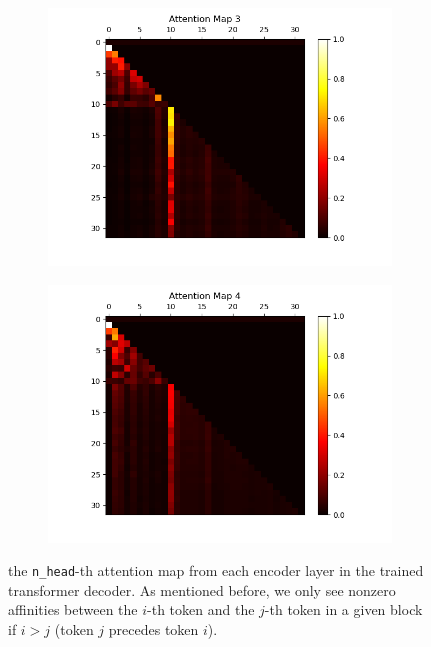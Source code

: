 \documentclass[10pt]{article}
\newcommand{\code}[1]{\texttt{#1}}
\theoremstyle{definition}
\begin{document}
\begin{figure}[H]
\begin{subfigure}[b]{0.35\textwidth}
        \label{subfig:am2}
    \end{subfigure}
    \begin{subfigure}[b]{0.35\textwidth}
        \centering
        \includegraphics[width=\textwidth]{../data/plots/part2/attention_map_3.png}
        \label{subfig:am3}
    \end{subfigure}
    \begin{subfigure}[b]{0.35\textwidth}
        \centering
        \includegraphics[width=\textwidth]{../data/plots/part2/attention_map_4.png}
        \label{subfig:am4}
    \end{subfigure}
\caption{the \code{n\_head}-th attention map from each encoder layer in the trained transformer decoder. As mentioned before, we only see nonzero affinities between the $i$-th token and the $j$-th token in a given block if $i > j$ (token $j$ precedes token $i$).}
\end{figure}
\end{document}
